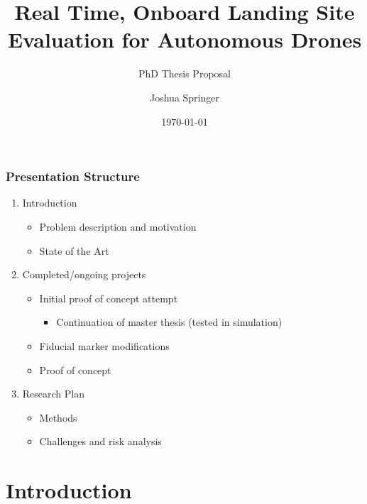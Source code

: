 \documentclass[aspectratio=169]{rubeamer}
\title[PhD Thesis Proposal]{\Large Real Time, Onboard Landing Site Evaluation for Autonomous Drones}
\subtitle[demo]{PhD Thesis Proposal}
\author[Springer]{Joshua Springer}
\institute[RU]{Reykjavík University}
\date[2022]{\monthyeardate\today}%
\begin{document}

\begin{frame}[plain]%
  \titlepage

\end{frame}

\begin{frame}
  \frametitle{Presentation Structure}
  \begin{enumerate}
    \item Introduction
      \begin{itemize}
        \item Problem description and motivation
        \item State of the Art
      \end{itemize}
    \item Completed/ongoing projects
      \begin{itemize}
        \item Initial proof of concept attempt
          \begin{itemize}
            \item Continuation of master thesis (tested in simulation)
          \end{itemize}
        \item Fiducial marker modifications
        \item Proof of concept
      \end{itemize}
    \item Research Plan
      \begin{itemize}
        \item Methods
        \item Challenges and risk analysis
      \end{itemize}
  \end{enumerate}
\end{frame}

\section{Introduction}
\end{document}
